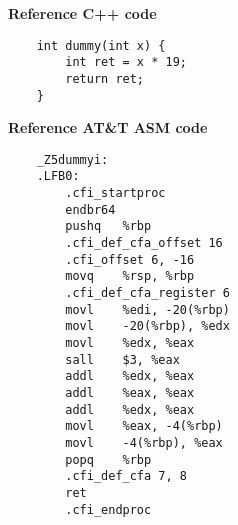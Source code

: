 \documentclass{article}
\begin{document}


{\huge \textbf{Reference C++ code\:}}

\begin{verbatim}
    int dummy(int x) {
        int ret = x * 19;
        return ret;
    }
\end{verbatim}

\vfill
\newpage

{\huge \textbf{Reference AT\&T ASM code\:}}
\begin{verbatim}
    _Z5dummyi:
    .LFB0:
	    .cfi_startproc
	    endbr64
	    pushq	%rbp
	    .cfi_def_cfa_offset 16
	    .cfi_offset 6, -16
	    movq	%rsp, %rbp
	    .cfi_def_cfa_register 6
	    movl	%edi, -20(%rbp)
	    movl	-20(%rbp), %edx
	    movl	%edx, %eax
	    sall	$3, %eax
	    addl	%edx, %eax
	    addl	%eax, %eax
	    addl	%edx, %eax
	    movl	%eax, -4(%rbp)
	    movl	-4(%rbp), %eax
	    popq	%rbp
	    .cfi_def_cfa 7, 8
	    ret
	    .cfi_endproc
\end{verbatim}

\vfill
\newpage
\end{document}
